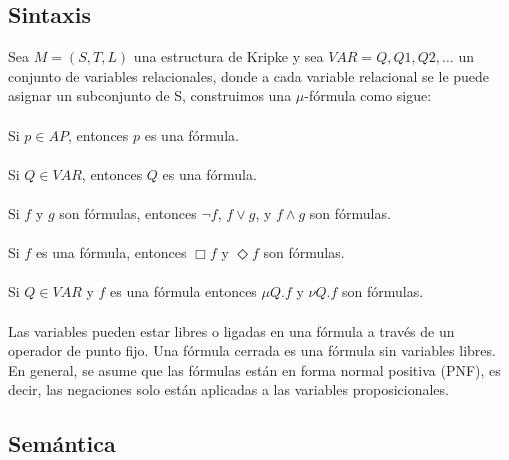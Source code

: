 \subsection{Sintaxis}

Sea $M = (S, T, L)$ una estructura de Kripke y sea $VAR = {Q, Q1, Q2, …}$ un conjunto de variables relacionales, donde a cada variable relacional se le puede asignar un subconjunto de S, construimos una $\mu$-fórmula como sigue: \\
\\
Si $p \in AP$, entonces $p$ es una fórmula. \\
\\
Si $Q \in VAR$, entonces $Q$ es una fórmula. \\
\\
Si $f$ y $g$ son fórmulas, entonces $\neg f$, $f \lor g$, y $f \land g$ son fórmulas. \\
\\
Si $f$ es una fórmula, entonces $\Box f$ y $\Diamond f$ son fórmulas. \\
\\
Si $Q \in VAR$ y $f$ es una fórmula entonces $\mu Q.f$ y $\nu Q.f$ son fórmulas. \\
\\
Las variables pueden estar libres o ligadas en una fórmula a través de un operador de punto fijo. Una fórmula cerrada es una fórmula sin variables libres. En general, se asume que las fórmulas están en forma normal positiva (PNF), es decir, las negaciones solo están aplicadas a las variables proposicionales.

\subsection{Semántica}

